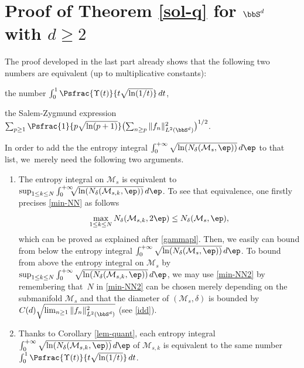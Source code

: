 \section{Proof of Theorem \ref{sol-q} for \texorpdfstring{$\bbS^d$ with $d\geq 2$}{Sd2}}\label{preuv-solq}

The proof developed in the last part already shows that the following two numbers are equivalent (up to multiplicative constants):
\begin{enumeratei}
\item the number $ \int_{0}^1 \Psfrac{\Upsilon(t)}{t\sqrt{\ln(1/t)}}\, dt$,
\item the Salem-Zygmund expression $\sum_{p\geq 1} \Psfrac{1}{p\sqrt{\ln(p+1)}} \bigl(\sum_{n\geq p} \|f_n\|_{L^2(\bbS^d)}^2 \bigr)^{1/2}$.
\end{enumeratei}
In order to add the the entropy integral $\int_{0}^{+\infty} \sqrt{\ln(N_{\delta}(\mathcal{M}_s,\ep))}\,d\ep$ to that list, we~merely need the following two arguments.

\begin{enumerate}\renewcommand{\theenumi}{\alph{enumi}}
\item
The entropy integral on $\mathcal{M}_s$ is equivalent to $\sup_{1\leq k\leq N}
\int_{0}^{+\infty} \hspace*{-2mm}\sqrt{\ln(N_{\delta}(\mathcal{M}_{s,k},\ep))}\,d\ep$. To see that equivalence, one firstly precises \eqref{min-NN} as follows
\begin{equation*}
\max_{1\leq k\leq N} N_{\delta}(\mathcal{M}_{s,k},2\ep) \leq N_{\delta}(\mathcal{M}_s,\ep),
\end{equation*}
which can be proved as explained after \eqref{gammapl}. Then, we easily can bound from below the
entropy integral $
\int_{0}^{+\infty} \sqrt{\ln(N_{\delta}(\mathcal{M}_s,\ep))}\,d\ep$. To bound from above the entropy integral on $\mathcal{M}_s$ by $\sup_{1\leq k\leq N}
\int_{0}^{+\infty} \sqrt{\ln(N_{\delta}(\mathcal{M}_{s,k},\ep))}\,d\ep$, we may use \eqref{min-NN2} by remembering that~$N$ in
\eqref{min-NN2} can be chosen merely depending on the submanifold $\mathcal{M}_s$ and that the diameter of $(\mathcal{M}_s,\delta)$ is bounded by $C(d)\sqrt{\lim_{n\geq 1} \|f_n\|_{L^2(\bbS^d)}^2}$ (see \eqref{idd}).

\item
Thanks to Corollary \ref{lem-quant}, each entropy integral
$\int_{0}^{+\infty} \sqrt{\ln(N_{\delta}(\mathcal{M}_{s,k},\ep))}\,d\ep$ of $\mathcal{M}_{s,k}$ is equivalent to the same number $ \int_{0}^1 \Psfrac{\Upsilon(t)}{t\sqrt{\ln(1/t)}} \,dt$.
\end{enumerate}

